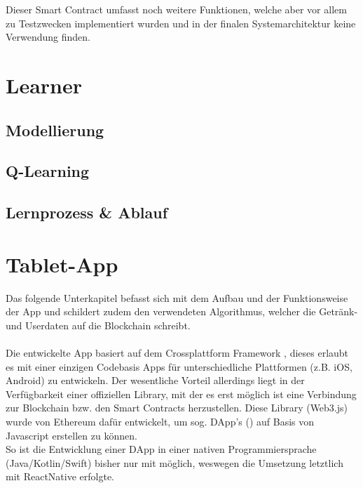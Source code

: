 Dieser Smart Contract umfasst noch weitere Funktionen, welche aber vor allem zu Testzwecken implementiert wurden und in der finalen Systemarchitektur keine Verwendung finden. 


\section{Learner}
\label{sec:ql}

\subsection{Modellierung}
\label{subsec:modulation}

\subsection{Q-Learning}
\label{subsec:y-ql}

\subsection{Lernprozess \& Ablauf}
\label{subsec:learning}


\section{Tablet-App}
\label{sec:app}

Das folgende Unterkapitel befasst sich mit dem Aufbau und der Funktionsweise der App und schildert zudem den verwendeten Algorithmus, welcher die Getränk- und Userdaten auf die Blockchain schreibt.\\\\
Die entwickelte App basiert auf dem Crossplattform Framework  \cite{RN:ReactNative}, dieses erlaubt es mit einer einzigen Codebasis Apps für unterschiedliche Plattformen (z.B. iOS, Android) zu entwickeln. Der wesentliche Vorteil allerdings liegt in der Verfügbarkeit einer offiziellen Library, mit der es erst möglich ist eine Verbindung zur Blockchain bzw. den Smart Contracts herzustellen. Diese Library (Web3.js) wurde von Ethereum dafür entwickelt, um sog. DApp's () \cite{DApp} auf Basis von Javascript erstellen zu können. \\
So ist die Entwicklung einer DApp in einer nativen Programmiersprache (Java/Kotlin/Swift) bisher nur mit  möglich, weswegen die Umsetzung letztlich mit ReactNative erfolgte.

